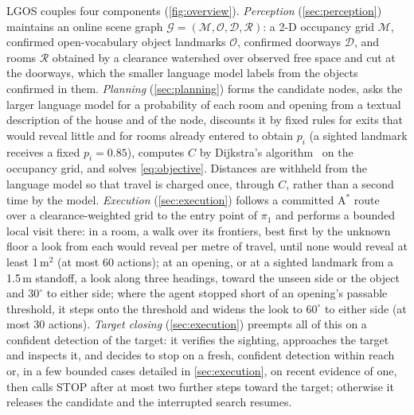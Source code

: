 \documentclass[10pt]{article}
\newcommand{\ours}{LGOS\xspace}
\newcommand{\G}{\mathcal{G}}
\newcommand{\M}{\mathcal{M}}
\newcommand{\Ob}{\mathcal{O}}
\newcommand{\D}{\mathcal{D}}
\newcommand{\R}{\mathcal{R}}
\begin{document}
\ours couples four components (\cref{fig:overview}). \emph{Perception} (\cref{sec:perception}) maintains an online
scene graph $\G = (\M, \Ob, \D, \R)$: a 2-D occupancy grid $\M$, confirmed open-vocabulary object landmarks $\Ob$,
confirmed doorways $\D$, and rooms $\R$ obtained by a clearance watershed over observed free space and cut at the
doorways, which the smaller language model labels from the objects confirmed in them. \emph{Planning}
(\cref{sec:planning}) forms the candidate nodes, asks the larger language model for a probability of each room
and opening from a textual description of the house and of the node, discounts it by fixed rules for exits that would
reveal little and for rooms already entered to obtain $p_i$ (a sighted landmark receives a fixed
$p_i = 0.85$), computes $C$ by Dijkstra's algorithm~\citep{dijkstra1959note} on the occupancy grid, and solves
\cref{eq:objective}. Distances are withheld from the language model so that travel is charged once, through $C$,
rather than a second time by the model. \emph{Execution} (\cref{sec:execution}) follows a committed A$^*$
route~\citep{hart1968formal} over a clearance-weighted grid to the entry point of $\pi_1$ and performs a bounded local
visit there: in a room, a walk over its frontiers, best first by the unknown floor a look from each would reveal per
metre of travel, until none would reveal at least 1\,m$^2$ (at most 60 actions); at an opening, or at a sighted
landmark from a 1.5\,m standoff, a look along three headings, toward the unseen side or the object and $30^\circ$ to
either side; where the agent stopped short of an opening's passable threshold, it steps onto the threshold and widens
the look to $60^\circ$ to either side (at most 30 actions). \emph{Target closing}
(\cref{sec:execution}) preempts all of this on a confident detection of the target: it verifies the sighting,
approaches the target and inspects it, and decides to stop on a fresh, confident detection within reach or, in a
few bounded cases detailed in \cref{sec:execution}, on recent evidence of one, then calls STOP after at most two
further steps toward the target; otherwise it releases the candidate and
the interrupted search resumes.
\end{document}
